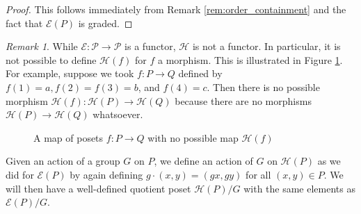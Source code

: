 \documentclass[smallextended, envcountsame, numbook]{svjour3}
\theoremstyle{plain}
\theoremstyle{definition}
\theoremstyle{remark}
\newtheorem{rmk}[thm]{Remark}
\numberwithin{equation}{section}
\begin{document}
\begin{proof}
This follows immediately from Remark \ref{rem:order_containment} and the fact that $\mathcal E(P)$ is graded.
\end{proof}

\begin{rmk}
While $\mathcal E\colon\mathcal P \rightarrow \mathcal P$ is a functor, $\mathcal H$ is not a functor. In particular, it is not possible to define $\mathcal H(f)$ for $f$ a morphism. This is illustrated in Figure \ref{fig:h_morphism}. For example, suppose we took $f\colon P \rightarrow Q$ defined by $f(1) = a, f(2) = f(3) = b$, and $f(4) = c$. 
Then there is no possible morphism $\mathcal H(f)\colon\mathcal H(P)\rightarrow \mathcal H(Q)$ because there are no morphisms $\mathcal H(P) \rightarrow \mathcal H(Q)$ whatsoever. 

\begin{figure}[h!]
\begin{center}
\quad
{}\quad
{} \quad
{}
\end{center}
\caption{\label{fig:h_morphism} A map of posets $f:P \rightarrow Q$ with no possible map $\mathcal H(f)$}
\end{figure}
\end{rmk}



Given an action of a group $G$ on $P$, we define an action of $G$ on $\mathcal{H}(P)$ as we did for $\mathcal{E}(P)$ by again defining $g\cdot (x,y) = (gx,gy)$ for all $(x,y)\in P$.  We will then have a well-defined quotient poset $\mathcal{H}(P)/G$ with the same elements as $\mathcal{E}(P)/G$.
\end{document}
